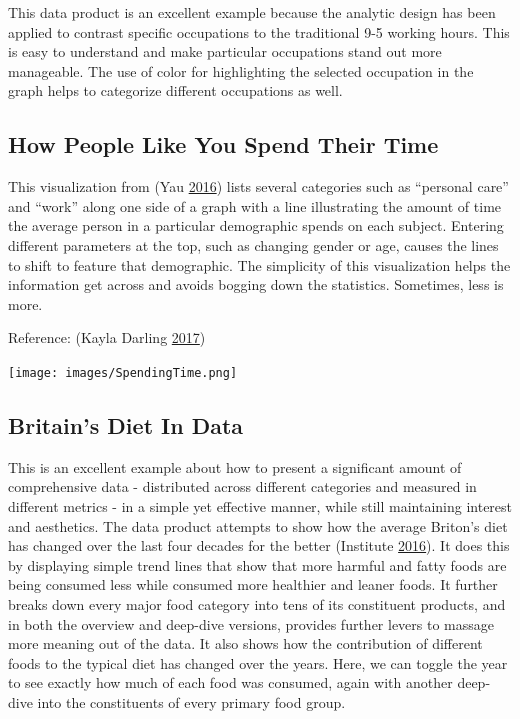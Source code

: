 \documentclass[]{book}
\begin{document}
This data product is an excellent example because the analytic design has been applied to contrast specific occupations to the traditional 9-5 working hours. This is easy to understand and make particular occupations stand out more manageable. The use of color for highlighting the selected occupation in the graph helps to categorize different occupations as well.

\hypertarget{how-people-like-you-spend-their-time}{%
\subsection{How People Like You Spend Their Time}\label{how-people-like-you-spend-their-time}}

This visualization from (Yau \protect\hyperlink{ref-spendingtime}{2016}) lists several categories such as ``personal care'' and ``work'' along one side of a graph with a line illustrating the amount of time the average person in a particular demographic spends on each subject. Entering different parameters at the top, such as changing gender or age, causes the lines to shift to feature that demographic. The simplicity of this visualization helps the information get across and avoids bogging down the statistics. Sometimes, less is more.

Reference: (Kayla Darling \protect\hyperlink{ref-cool_data}{2017})

\texttt{[image: images/SpendingTime.png]}

\hypertarget{britains-diet-in-data}{%
\subsection{Britain's Diet In Data}\label{britains-diet-in-data}}

This is an excellent example about how to present a significant amount of comprehensive data - distributed across different categories and measured in different metrics - in a simple yet effective manner, while still maintaining interest and aesthetics. The data product attempts to show how the average Briton's diet has changed over the last four decades for the better (Institute \protect\hyperlink{ref-britain_diet_2016}{2016}). It does this by displaying simple trend lines that show that more harmful and fatty foods are being consumed less while consumed more healthier and leaner foods. It further breaks down every major food category into tens of its constituent products, and in both the overview and deep-dive versions, provides further levers to massage more meaning out of the data. It also shows how the contribution of different foods to the typical diet has changed over the years. Here, we can toggle the year to see exactly how much of each food was consumed, again with another deep-dive into the constituents of every primary food group.
\end{document}
